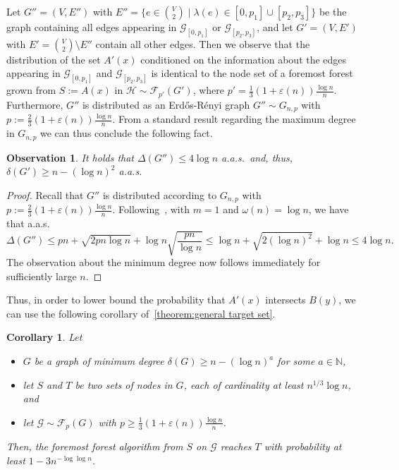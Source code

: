 \documentclass[a4paper,11pt]{article}
\theoremstyle{definition}
\theoremstyle{plain}
\newtheorem{corollary}{Corollary}
\newtheorem{observation}{Observation}
\let\eps\varepsilon
\newcommand{\NN}{\ensuremath{\mathbb{N}}}
\newcommand{\FFF}{\mathcal{F}}
\newcommand{\GGG}{\mathcal{G}}
\newcommand{\HHH}{\mathcal{H}}
\newcommand{\Erdos}{Erd\H{o}s}
\newcommand{\Renyi}{R\'enyi}
\newcommand{\ER}{\Erdos-\Renyi}
\begin{document}
Let $G'' = (V, E'')$ with
$E'' = \{e \in \binom{V}{2} \mid \lambda(e) \in [0, p_1] \cup [p_2, p_3]\}$
be the graph containing all edges appearing in $\GGG_{[0, p_1]}$ or $\GGG_{[p_2, p_3]}$,
and let $G' = (V, E')$ with $E' = \binom{V}{2} \setminus E''$ contain all other edges.
Then we observe that the distribution of the set $A'(x)$ conditioned on the information about the edges appearing in $\GGG_{[0,p_1]}$ and $\GGG_{[p_2, p_3]}$ is identical to the node set of a foremost forest grown from $S:=A(x)$ in $\HHH\sim \FFF_{p'}(G')$,
where $p'=\frac{1}{3}(1+\eps(n))\frac{\log n}{n}$.
Furthermore, $G''$ is distributed as an \ER{} graph $G'' \sim G_{n, p}$ with $p:=\frac{2}{3}(1+\eps(n))\frac{\log n}{n}$.
From a standard result regarding the maximum degree in $G_{n,p}$ we can thus conclude the following fact.
\begin{observation}\label{obs: min degree}
	It holds that $\Delta(G'')\le 4\log n$ a.a.s.\ and, thus, $\delta(G')\ge n - (\log n)^2$ a.a.s.
\end{observation}
\begin{proof}
	Recall that $G''$ is distributed according to $G_{n, p}$ with $p:=\frac{2}{3}(1+\eps(n))\frac{\log n}{n}$. Following~\cite[Corollary 3.13]{Bollobas2001}, with $m=1$ and $\omega(n)=\log n$, we have that a.a.s.\
	\[
			\Delta(G'') \leq pn + \sqrt{2pn\log n} + \log n \sqrt{\frac{pn}{\log n}}
			\le \log n + \sqrt{2 (\log n)^2} + \log n
			\le 4 \log n.
	\]
	The observation about the minimum degree now follows immediately for sufficiently large $n$.
\end{proof}
Thus, in order to lower bound the probability that $A'(x)$ intersects $B(y)$, we can use the following corollary of~\cref{theorem:general target set}.
%
\begin{corollary}\label{corollary: target set}
  Let
  \begin{itemize}
    \item $G$ be a graph of minimum degree $\delta(G)\ge n - (\log n)^a$ for some $a\in\NN$,
    \item let $S$ and $T$ be two sets of nodes in $G$, each of cardinality at least $n^{1/3}\log n$, and
    \item let $\GGG\sim \FFF_{p}(G)$ with $p\ge \frac{1}{3}(1+\eps(n))\frac{\log n}{n}$.
  \end{itemize}
  Then, the foremost forest algorithm from $S$ on $\GGG$ reaches $T$ with probability at least $1-3n^{-\log\log n}$.
\end{corollary}
\end{document}
